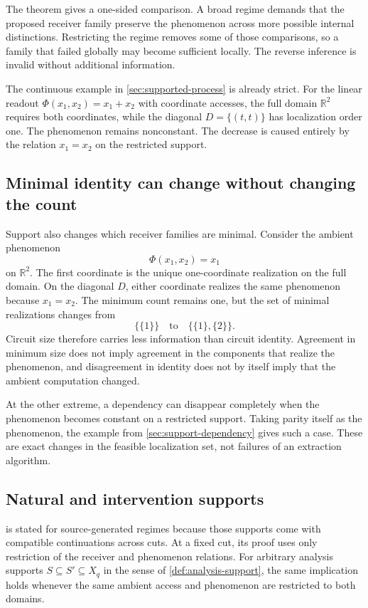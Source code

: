 The theorem gives a one-sided comparison. A broad regime demands that the proposed receiver family preserve the phenomenon across more possible internal distinctions. Restricting the regime removes some of those comparisons, so a family that failed globally may become sufficient locally. The reverse inference is invalid without additional information.

The continuous example in \cref{sec:supported-process} is already strict. For the linear readout $\Phi(x_1,x_2)=x_1+x_2$ with coordinate accesses, the full domain $\mathbb R^2$ requires both coordinates, while the diagonal $D=\{(t,t)\}$ has localization order one. The phenomenon remains nonconstant. The decrease is caused entirely by the relation $x_1=x_2$ on the restricted support.

\subsection{Minimal identity can change without changing the count}

Support also changes which receiver families are minimal. Consider the ambient phenomenon
\[
\Phi(x_1,x_2)=x_1
\]
on $\mathbb R^2$. The first coordinate is the unique one-coordinate realization on the full domain. On the diagonal $D$, either coordinate realizes the same phenomenon because $x_1=x_2$. The minimum count remains one, but the set of minimal realizations changes from
\[
\bigl\{\{1\}\bigr\}
\quad\text{to}\quad
\bigl\{\{1\},\{2\}\bigr\}.
\]
Circuit size therefore carries less information than circuit identity. Agreement in minimum size does not imply agreement in the components that realize the phenomenon, and disagreement in identity does not by itself imply that the ambient computation changed.

At the other extreme, a dependency can disappear completely when the phenomenon becomes constant on a restricted support. Taking parity itself as the phenomenon, the example from \cref{sec:support-dependency} gives such a case. These are exact changes in the feasible localization set, not failures of an extraction algorithm.

\subsection{Natural and intervention supports}

 is stated for source-generated regimes because those supports come with compatible continuations across cuts. At a fixed cut, its proof uses only restriction of the receiver and phenomenon relations. For arbitrary analysis supports $S\subseteq S'\subseteq X_q$ in the sense of \cref{def:analysis-support}, the same implication holds whenever the same ambient access and phenomenon are restricted to both domains.

